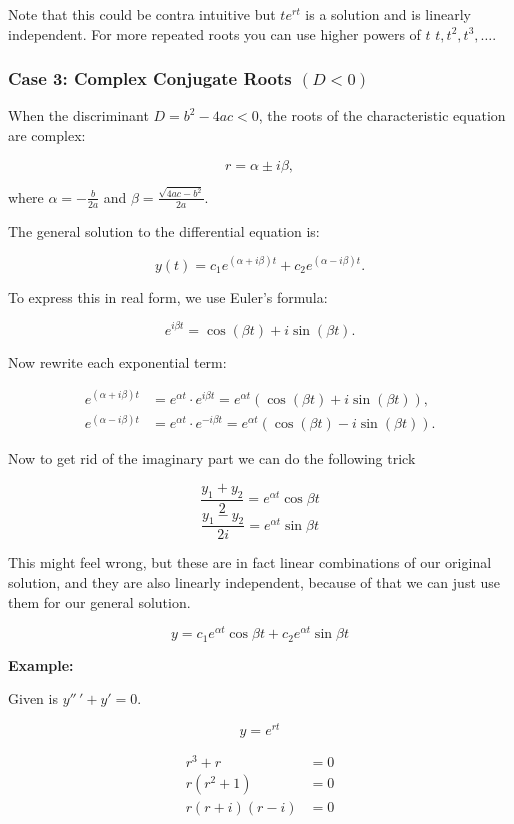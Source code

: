 Note that this could be contra intuitive but \(te^{rt}\) is a solution and is linearly independent.
For more repeated roots you can use higher powers of \(t\) \(t, t^2, t^3, \dots\).

\subsubsection{Case 3: Complex Conjugate Roots \texorpdfstring{\( (D < 0) \)}{}}

When the discriminant \( D = b^2 - 4ac < 0 \), the roots of the characteristic equation are complex:

\[
    r = \alpha \pm i\beta,
\]

where \( \alpha = -\frac{b}{2a} \) and \( \beta = \frac{\sqrt{4ac - b^2}}{2a} \).

The general solution to the differential equation is:

\[
    y(t) = c_1 e^{(\alpha + i\beta)t} + c_2 e^{(\alpha - i\beta)t}.
\]

To express this in real form, we use Euler’s formula:

\[
    e^{i\beta t} = \cos(\beta t) + i\sin(\beta t).
\]

Now rewrite each exponential term:

\begin{align*}
    e^{(\alpha + i\beta)t} &= e^{\alpha t} \cdot e^{i\beta t} = e^{\alpha t} (\cos(\beta t) + i \sin(\beta t)), \\
    e^{(\alpha - i\beta)t} &= e^{\alpha t} \cdot e^{-i\beta t} = e^{\alpha t} (\cos(\beta t) - i \sin(\beta t)).
\end{align*}

Now to get rid of the imaginary part we can do the following trick

\[
    \frac{y_1 + y_2}{2} = e^{\alpha t}\cos\beta t
\]
\[
    \frac{y_1 - y_2}{2i} = e^{\alpha t}\sin\beta t
\]

This might feel wrong, but these are in fact linear combinations of our original solution,
and they are also linearly independent, because of that we can just use them for our general solution.

\[y = c_1 e^{\alpha t}\cos\beta t + c_2  e^{\alpha t}\sin\beta t\]

\textbf{Example:}

Given is \(y''\,' + y' = 0\).

\[
    y = e^{rt}
\]

\begin{align*}
r^3 + r &= 0\\
r(r^2 + 1) &= 0\\
r(r + i)(r - i) &= 0
\end{align*}

